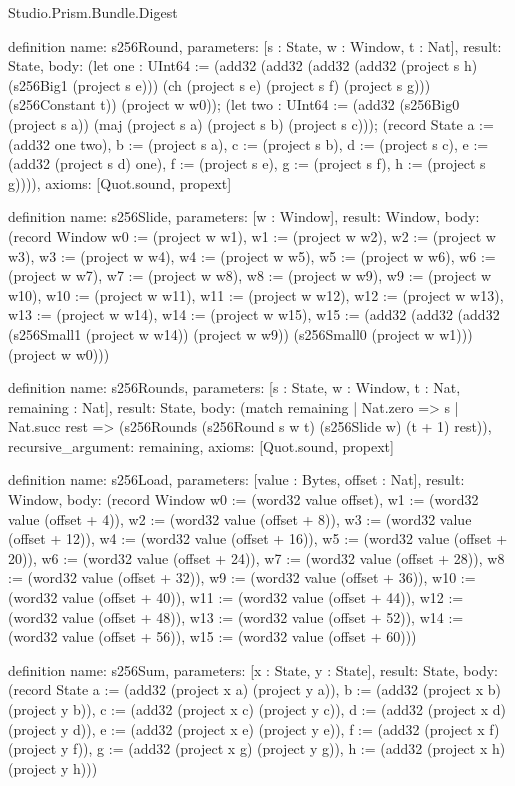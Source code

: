 \begin{lexlean}{Studio.Prism.Bundle.Digest}
\begin{semanticmodule}
definition{
  name: s256Round,
  parameters: [s : State, w : Window, t : Nat],
  result: State,
  body: (let one : UInt64 := (add32 (add32 (add32 (add32 (project s h) (s256Big1 (project s e))) (ch (project s e) (project s f) (project s g))) (s256Constant t)) (project w w0)); (let two : UInt64 := (add32 (s256Big0 (project s a)) (maj (project s a) (project s b) (project s c))); (record State {a := (add32 one two), b := (project s a), c := (project s b), d := (project s c), e := (add32 (project s d) one), f := (project s e), g := (project s f), h := (project s g)}))),
  axioms: [Quot.sound, propext]
}

definition{
  name: s256Slide,
  parameters: [w : Window],
  result: Window,
  body: (record Window {w0 := (project w w1), w1 := (project w w2), w2 := (project w w3), w3 := (project w w4), w4 := (project w w5), w5 := (project w w6), w6 := (project w w7), w7 := (project w w8), w8 := (project w w9), w9 := (project w w10), w10 := (project w w11), w11 := (project w w12), w12 := (project w w13), w13 := (project w w14), w14 := (project w w15), w15 := (add32 (add32 (add32 (s256Small1 (project w w14)) (project w w9)) (s256Small0 (project w w1))) (project w w0))})
}

definition{
  name: s256Rounds,
  parameters: [s : State, w : Window, t : Nat, remaining : Nat],
  result: State,
  body: (match remaining
    | Nat.zero => s
    | Nat.succ rest => (s256Rounds (s256Round s w t) (s256Slide w) (t + 1) rest)),
  recursive_argument: remaining,
  axioms: [Quot.sound, propext]
}

definition{
  name: s256Load,
  parameters: [value : Bytes, offset : Nat],
  result: Window,
  body: (record Window {w0 := (word32 value offset), w1 := (word32 value (offset + 4)), w2 := (word32 value (offset + 8)), w3 := (word32 value (offset + 12)), w4 := (word32 value (offset + 16)), w5 := (word32 value (offset + 20)), w6 := (word32 value (offset + 24)), w7 := (word32 value (offset + 28)), w8 := (word32 value (offset + 32)), w9 := (word32 value (offset + 36)), w10 := (word32 value (offset + 40)), w11 := (word32 value (offset + 44)), w12 := (word32 value (offset + 48)), w13 := (word32 value (offset + 52)), w14 := (word32 value (offset + 56)), w15 := (word32 value (offset + 60))})
}

definition{
  name: s256Sum,
  parameters: [x : State, y : State],
  result: State,
  body: (record State {a := (add32 (project x a) (project y a)), b := (add32 (project x b) (project y b)), c := (add32 (project x c) (project y c)), d := (add32 (project x d) (project y d)), e := (add32 (project x e) (project y e)), f := (add32 (project x f) (project y f)), g := (add32 (project x g) (project y g)), h := (add32 (project x h) (project y h))})
}


\end{semanticmodule}
\end{lexlean}
